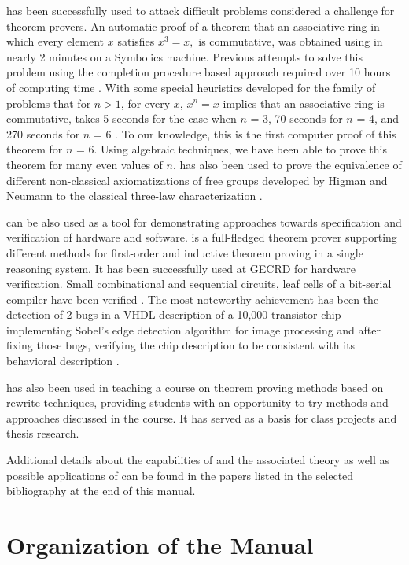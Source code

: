 \RRL has been successfully used to attack difficult problems
considered a challenge for theorem provers.  An automatic proof of a
theorem that an associative ring in which every element $x$ satisfies
$x^3 = x,$ is commutative, was obtained using \RRL in nearly 2 minutes
on a Symbolics machine.  Previous attempts to solve this problem using
the completion procedure based approach required over 10 hours of
computing time \cite{Stickel84}.  With some special heuristics
developed for the family of problems that for $n > 1$, for every $x$,
$x^n = x$ implies that an associative ring is commutative, \RRL takes
5 seconds for the case when $n$ = 3, 70 seconds for $n$ = 4, and 270
seconds for $n$ = 6 \cite{KMN84,ZK89}.  To our knowledge, this is the
first computer proof of this theorem for $n$ = 6. Using algebraic
techniques, we have been able to prove this theorem for many even
values of $n$. \RRL has also been used to prove the equivalence of
different non-classical axiomatizations of free groups developed by
Higman and Neumann to the classical three-law characterization
\cite{KZ882}.
 
\RRL can be also used as a tool for demonstrating approaches towards
specification and verification of hardware and software.  \RRL is a
full-fledged theorem prover supporting different methods for
first-order and inductive theorem proving in a single reasoning
system.  It has been successfully used at GECRD for hardware
verification. Small combinational and sequential circuits, leaf cells
of a bit-serial compiler have been verified \cite{NS881}. The most
noteworthy achievement has been the detection of 2 bugs in a VHDL
description of a 10,000 transistor chip implementing Sobel's edge
detection algorithm for image processing and after fixing those bugs,
verifying the chip description to be consistent with its behavioral
description \cite{NS882}.

\RRL has also been used in teaching a course on theorem proving
methods based on rewrite techniques, 
providing students with an opportunity to try methods and
approaches discussed in the course.  It has served as a basis for
class projects and thesis research. 

Additional details about the capabilities of \RRL and the associated theory
as well as possible applications of \RRL can be found in the 
papers listed in the selected bibliography at the end of this manual.

\section{Organization of the Manual}
  

